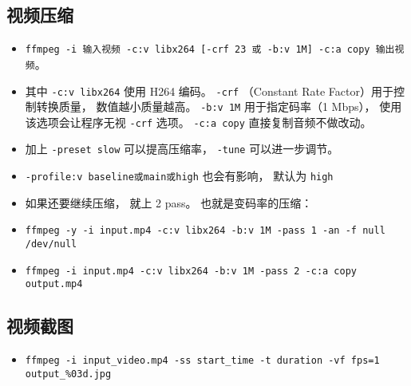 \subsection{视频压缩}
\begin{itemize}
\item \verb|ffmpeg -i 输入视频 -c:v libx264 [-crf 23 或 -b:v 1M] -c:a copy 输出视频|。
\item 其中 \verb|-c:v libx264| 使用 H264 编码。 \verb|-crf| （Constant Rate Factor）用于控制转换质量， 数值越小质量越高。 \verb|-b:v 1M| 用于指定码率（1 Mbps）， 使用该选项会让程序无视 \verb|-crf| 选项。 \verb|-c:a copy| 直接复制音频不做改动。
\item 加上 \verb|-preset slow| 可以提高压缩率， \verb|-tune| 可以进一步调节。
\item \verb|-profile:v baseline或main或high| 也会有影响， 默认为 \verb|high|
\item 如果还要继续压缩， 就上 2 pass。 也就是变码率的压缩：
\item \verb|ffmpeg -y -i input.mp4 -c:v libx264 -b:v 1M -pass 1 -an -f null /dev/null|
\item \verb|ffmpeg -i input.mp4 -c:v libx264 -b:v 1M -pass 2 -c:a copy output.mp4|
\end{itemize}


\subsection{视频截图}
\begin{itemize}
\item \verb|ffmpeg -i input_video.mp4 -ss start_time -t duration -vf fps=1 output_%03d.jpg|
\end{itemize}
